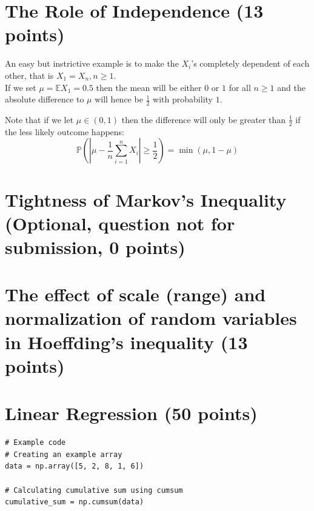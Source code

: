 \documentclass[a4paper,12pt]{article}
\begin{document}
\section{The Role of Independence (13 points)}
An easy but instrictive example is to make the $X_i$'s completely dependent of each other, that is $X_1 = X_n, n \geq 1$. \\
If we set $\mu = \mathbb{E} X_1 = 0.5$ then the mean will be either $0$ or $1$ for all $n \geq 1$ and the absolute difference to $\mu$ will hence be $\frac{1}{2}$ with probability $1$. 

Note that if we let $\mu \in (0,1)$ then the difference will only be greater than $\frac{1}{2}$ if the less likely outcome happens:
$$
\mathbb{P}\left( | \mu - \frac{1}{n}\sum_{i = 1}^n X_i  |   \geq \frac{1}{2} \right)  = \min(\mu, 1-\mu)
$$

\section{Tightness of Markov’s Inequality (Optional, question not for submission, 0 points)}

\section{The effect of scale (range) and normalization of random variables in Hoeffding's inequality (13 points)}

\section{Linear Regression (50 points)}

\begin{lstlisting}
# Example code
# Creating an example array
data = np.array([5, 2, 8, 1, 6])

# Calculating cumulative sum using cumsum
cumulative_sum = np.cumsum(data)
\end{lstlisting}

\end{document}
